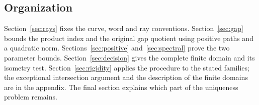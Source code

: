 

\subsection{Organization}

Section~\ref{sec:rays} fixes the curve, word and ray conventions.
Section~\ref{sec:gap} bounds the product index and the original gap
quotient using positive paths and a quadratic norm.
Sections~\ref{sec:positive} and~\ref{sec:spectral} prove the two
parameter bounds. Section~\ref{sec:decision} gives the complete finite
domain and its isometry test. Section~\ref{sec:rigidity} applies the
procedure to the stated families; the exceptional intersection argument
and the description of the finite domains are in the appendix.
The final section explains which part of the uniqueness problem remains.
